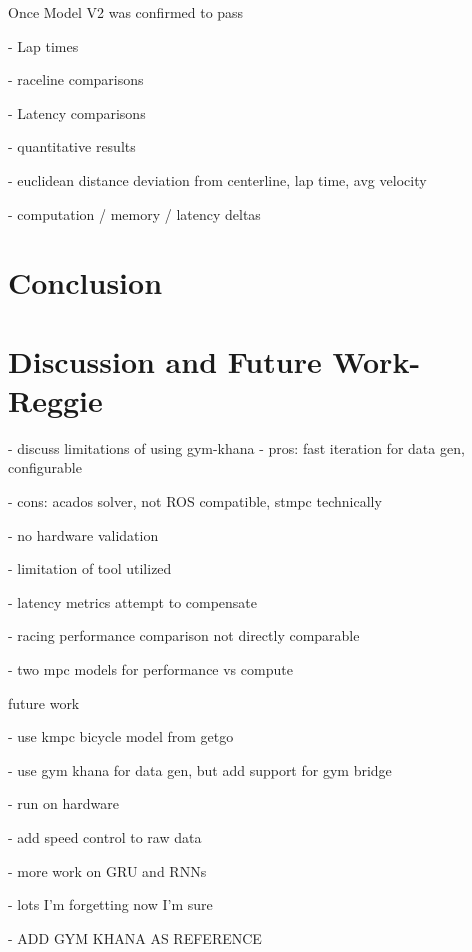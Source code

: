\documentclass[conference]{IEEEtran}
\begin{document}
Once Model V2 was confirmed to pass 

- Lap times



- raceline comparisons 


- Latency comparisons 




- quantitative results

    - euclidean distance deviation from centerline, lap time, avg velocity
    
    - computation / memory / latency deltas

\section{Conclusion}


\section{Discussion and Future Work-Reggie}

- discuss limitations of using gym-khana
    - pros: fast iteration for data gen, configurable
    
    - cons: acados solver, not ROS compatible, stmpc technically
    
- no hardware validation

    - limitation of tool utilized
    
    - latency metrics attempt to compensate
    
- racing performance comparison not directly comparable

- two mpc models for performance vs compute

future work

- use kmpc bicycle model from getgo

- use gym khana for data gen, but add support for gym bridge

- run on hardware

- add speed control to raw data

- more work on GRU and RNNs

- lots I'm forgetting now I'm sure

- ADD GYM KHANA AS REFERENCE




\end{document}

